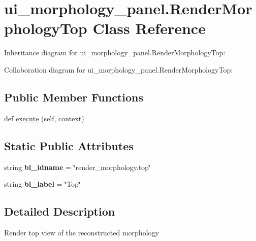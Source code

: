\hypertarget{classui__morphology__panel_1_1RenderMorphologyTop}{}\section{ui\+\_\+morphology\+\_\+panel.\+Render\+Morphology\+Top Class Reference}
\label{classui__morphology__panel_1_1RenderMorphologyTop}


Inheritance diagram for ui\+\_\+morphology\+\_\+panel.\+Render\+Morphology\+Top\+:


Collaboration diagram for ui\+\_\+morphology\+\_\+panel.\+Render\+Morphology\+Top\+:
\subsection*{Public Member Functions}
\begin{DoxyCompactItemize}
\item 
def \hyperlink{classui__morphology__panel_1_1RenderMorphologyTop_a0c6e737191a571982c24e20c78fd0ed1}{execute} (self, context)
\end{DoxyCompactItemize}
\subsection*{Static Public Attributes}
\begin{DoxyCompactItemize}
\item 
string {\bfseries bl\+\_\+idname} = \char`\"{}render\+\_\+morphology.\+top\char`\"{}\hypertarget{classui__morphology__panel_1_1RenderMorphologyTop_a67690da6ed6529be2e306580c208fb5c}{}\label{classui__morphology__panel_1_1RenderMorphologyTop_a67690da6ed6529be2e306580c208fb5c}

\item 
string {\bfseries bl\+\_\+label} = \char`\"{}Top\char`\"{}\hypertarget{classui__morphology__panel_1_1RenderMorphologyTop_a968f34b166e51f81db678075177087dc}{}\label{classui__morphology__panel_1_1RenderMorphologyTop_a968f34b166e51f81db678075177087dc}

\end{DoxyCompactItemize}


\subsection{Detailed Description}
\begin{DoxyVerb}Render top view of the reconstructed morphology\end{DoxyVerb}
 

